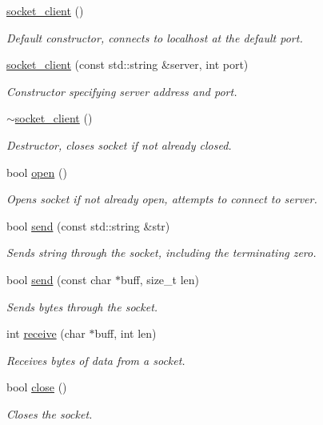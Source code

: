 \begin{DoxyCompactItemize}
\item 
\hyperlink{classcpen333_1_1process_1_1posix_1_1socket__client_ad64689be09343aa92a4891cec8091e2a}{socket\+\_\+client} ()
\begin{DoxyCompactList}\small\item\em Default constructor, connects to localhost at the default port. \end{DoxyCompactList}\item 
\hyperlink{classcpen333_1_1process_1_1posix_1_1socket__client_a846e54b0c2175d0657edb23687a2d882}{socket\+\_\+client} (const std\+::string \&server, int port)
\begin{DoxyCompactList}\small\item\em Constructor specifying server address and port. \end{DoxyCompactList}\item 
\hyperlink{classcpen333_1_1process_1_1posix_1_1socket__client_ad5b9c506d3499a69ae02517cc73a5a4a}{$\sim$socket\+\_\+client} ()
\begin{DoxyCompactList}\small\item\em Destructor, closes socket if not already closed. \end{DoxyCompactList}\item 
bool \hyperlink{classcpen333_1_1process_1_1posix_1_1socket__client_ad97e32714907d8c4566605926f718d88}{open} ()
\begin{DoxyCompactList}\small\item\em Opens socket if not already open, attempts to connect to server. \end{DoxyCompactList}\item 
bool \hyperlink{classcpen333_1_1process_1_1posix_1_1socket__client_a17fee08b05864613e4ba677faa142d3a}{send} (const std\+::string \&str)
\begin{DoxyCompactList}\small\item\em Sends string through the socket, including the terminating zero. \end{DoxyCompactList}\item 
bool \hyperlink{classcpen333_1_1process_1_1posix_1_1socket__client_ac6b955fb383562a1f5699ed9a4dc416f}{send} (const char $\ast$buff, size\+\_\+t len)
\begin{DoxyCompactList}\small\item\em Sends bytes through the socket. \end{DoxyCompactList}\item 
int \hyperlink{classcpen333_1_1process_1_1posix_1_1socket__client_abab50366bba34ffac44ec8fd47435bec}{receive} (char $\ast$buff, int len)
\begin{DoxyCompactList}\small\item\em Receives bytes of data from a socket. \end{DoxyCompactList}\item 
bool \hyperlink{classcpen333_1_1process_1_1posix_1_1socket__client_a7b3b5257fc5a433ddea22b55e5c5098f}{close} ()
\begin{DoxyCompactList}\small\item\em Closes the socket. \end{DoxyCompactList}\end{DoxyCompactItemize}
